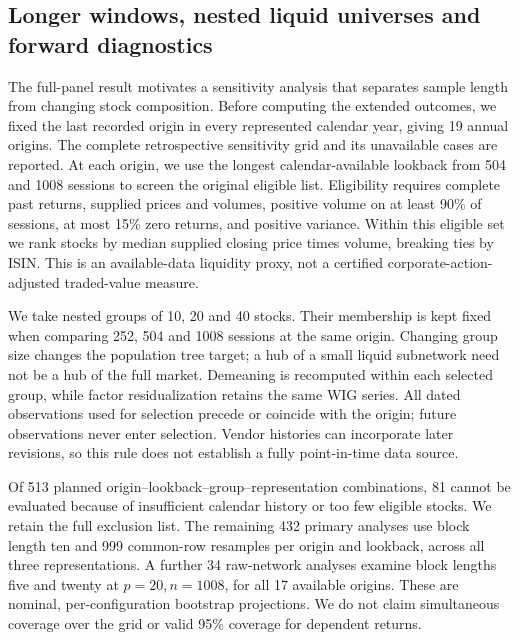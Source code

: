 \subsection{Longer windows, nested liquid universes and forward diagnostics}\label{sec:extended}
The full-panel result motivates a sensitivity analysis that separates sample length from changing stock composition. Before computing the extended outcomes, we fixed the last recorded origin in every represented calendar year, giving 19 annual origins. The complete retrospective sensitivity grid and its unavailable cases are reported. At each origin, we use the longest calendar-available lookback from 504 and 1008 sessions to screen the original eligible list. Eligibility requires complete past returns, supplied prices and volumes, positive volume on at least 90\% of sessions, at most 15\% zero returns, and positive variance. Within this eligible set we rank stocks by median supplied closing price times volume, breaking ties by ISIN. This is an available-data liquidity proxy, not a certified corporate-action-adjusted traded-value measure.

We take nested groups of 10, 20 and 40 stocks. Their membership is kept fixed when comparing 252, 504 and 1008 sessions at the same origin. Changing group size changes the population tree target; a hub of a small liquid subnetwork need not be a hub of the full market. Demeaning is recomputed within each selected group, while factor residualization retains the same WIG series. All dated observations used for selection precede or coincide with the origin; future observations never enter selection. Vendor histories can incorporate later revisions, so this rule does not establish a fully point-in-time data source.

Of 513 planned origin--lookback--group--representation combinations, 81 cannot be evaluated because of insufficient calendar history or too few eligible stocks. We retain the full exclusion list. The remaining 432 primary analyses use block length ten and 999 common-row resamples per origin and lookback, across all three representations. A further 34 raw-network analyses examine block lengths five and twenty at $p=20,n=1008$, for all 17 available origins. These are nominal, per-configuration bootstrap projections. We do not claim simultaneous coverage over the grid or valid 95\% coverage for dependent returns.

